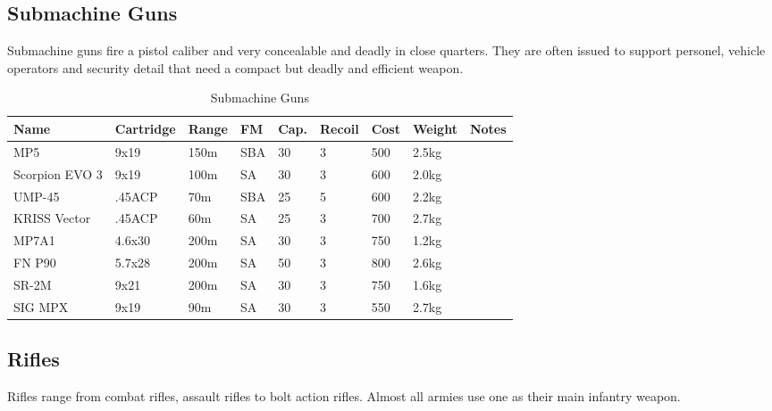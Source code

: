 \subsection{Submachine Guns}
\label{sub:9-Submachine Guns}

Submachine guns fire a pistol caliber and very concealable and deadly in close
quarters. They are often issued to support personel, vehicle operators and
security detail that need a compact but deadly and efficient weapon.

\begin{table}
  \caption{Submachine Guns}
  \label{tab:SMG}
  \begin{center}
    \begin{tabular}{| l | l | l | l | l | l | l | l | l |}
      \hline
      \textbf{Name} & \textbf{Cartridge} & \textbf{Range} &
      \textbf{FM} & \textbf{Cap.} & \textbf{Recoil} &
      \textbf{Cost} & \textbf{Weight} & \textbf{Notes} \\ \hline

      MP5            & 9x19   & 150m & SBA & 30 & 3 & 500 & 2.5kg & \\ \hline
      Scorpion EVO 3 & 9x19   & 100m & SA  & 30 & 3 & 600 & 2.0kg & \\ \hline

      UMP-45         & .45ACP &  70m & SBA & 25 & 5 & 600 & 2.2kg & \\ \hline
      KRISS Vector   & .45ACP &  60m & SA  & 25 & 3 & 700 & 2.7kg & \\ \hline

      MP7A1          & 4.6x30 & 200m & SA  & 30 & 3 & 750 & 1.2kg & \\ \hline
      FN P90         & 5.7x28 & 200m & SA  & 50 & 3 & 800 & 2.6kg & \\ \hline
      SR-2M          & 9x21   & 200m & SA  & 30 & 3 & 750 & 1.6kg & \\ \hline
      SIG MPX        & 9x19   &  90m & SA  & 30 & 3 & 550 & 2.7kg & \\ \hline

    \end{tabular}
  \end{center}
\end{table}

\subsection{Rifles}
\label{sub:9-Rifles}

Rifles range from combat rifles, assault rifles to bolt action rifles. Almost
all armies use one as their main infantry weapon.

